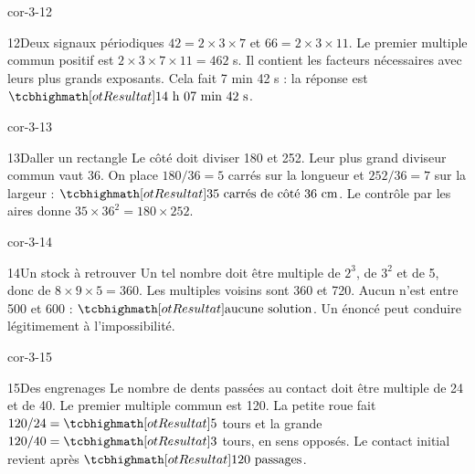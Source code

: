 \begin{blocLivre}{cor-3-12}\begin{corrige}{12}{Deux signaux périodiques}
$42=2\times3\times7$ et $66=2\times3\times11$. Le premier multiple commun positif est $2\times3\times7\times11=462$ s. Il contient les facteurs nécessaires avec leurs plus grands exposants. Cela fait 7 min 42 s : la réponse est $\res{14\text{ h }07\text{ min }42\text{ s}}$.
\end{corrige}\end{blocLivre}
\begin{blocLivre}{cor-3-13}\begin{corrige}{13}{Daller un rectangle}
Le côté doit diviser 180 et 252. Leur plus grand diviseur commun vaut 36. On place $180/36=5$ carrés sur la longueur et $252/36=7$ sur la largeur : $\res{35\text{ carrés de côté }36\text{ cm}}$. Le contrôle par les aires donne $35\times36^2=180\times252$.
\label{fig-cor-3-13}
\end{corrige}\end{blocLivre}
\begin{blocLivre}{cor-3-14}\begin{corrige}{14}{Un stock à retrouver}
Un tel nombre doit être multiple de $2^3$, de $3^2$ et de 5, donc de $8\times9\times5=360$. Les multiples voisins sont 360 et 720. Aucun n’est entre 500 et 600 : $\res{\text{aucune solution}}$. Un énoncé peut conduire légitimement à l’impossibilité.
\end{corrige}\end{blocLivre}
\begin{blocLivre}{cor-3-15}\begin{corrige}{15}{Des engrenages}
Le nombre de dents passées au contact doit être multiple de 24 et de 40. Le premier multiple commun est 120. La petite roue fait $120/24=\res5$ tours et la grande $120/40=\res3$ tours, en sens opposés. Le contact initial revient après $\res{120\text{ passages}}$.
\label{fig-cor-3-15}
\end{corrige}\end{blocLivre}
